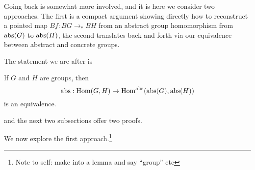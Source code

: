 Going back is somewhat more involved, and it is here we consider two approaches.
The first is a compact argument showing directly how to reconstruct a pointed map $Bf:BG\to_*BH$ from an abstract group homomorphism from $\mathrm{abs}(G)$ to $\mathrm{abs}(H)$, the second translates back and forth via our equivalence between abstract and concrete groups.



The statement we are after is


\begin{lemma}
  \label{lem:homomabstrconcr}
  If $G$ and $H$ are groups, then 
$$\mathrm{abs}:\mathrm{Hom}(G,H)\to\mathrm{Hom}^{\mathrm{abs}}(\mathrm{abs}(G),\mathrm{abs}(H))$$
is an equivalence.
\end{lemma}
and the next two subsections offer two proofs.



\label{sec:thierrysdelooping}
We now explore the first approach.\footnote{Note to self: make into a lemma and say ``group'' etc}

